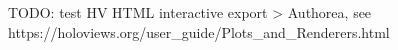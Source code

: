 TODO: test HV HTML interactive export > Authorea, see https://holoviews.org/user_guide/Plots_and_Renderers.html